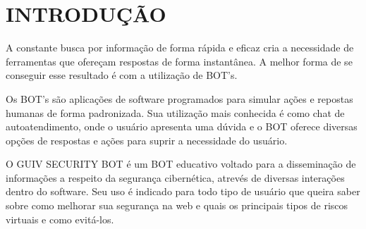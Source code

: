 \chapter{\uppercase{Introdução}}
\label{introducao}


A constante busca por informação de forma rápida e eficaz cria a necessidade de ferramentas que ofereçam respostas de forma instantânea. A melhor forma de se conseguir esse resultado é com a utilização de BOT's.

Os BOT's são aplicações de software programados para simular ações e repostas humanas de forma padronizada. Sua utilização mais conhecida é como chat de autoatendimento, onde o usuário apresenta uma dúvida e o BOT oferece diversas opções de respostas e ações para suprir a necessidade do usuário.

O GUIV SECURITY BOT é um BOT educativo voltado para a disseminação de informações a respeito da segurança cibernética, atrevés de diversas interações dentro do software. Seu uso é indicado para todo tipo de usuário que queira saber sobre como melhorar sua segurança na web e quais os principais tipos de riscos virtuais e como evitá-los.


